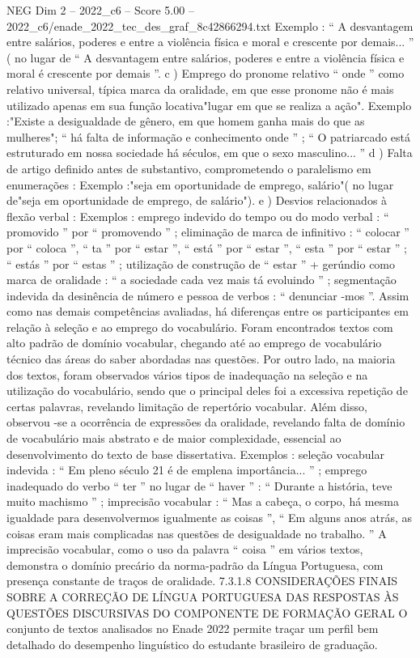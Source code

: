 \begin{textsample}{NEG Dim 2 – 2022\_c6 – Score 5.00 – 2022\_c6/enade\_2022\_tec\_des\_graf\_8c42866294.txt}
Exemplo : “ A desvantagem entre salários, poderes e entre a violência física e moral e crescente por demais... ” ( no lugar de “ A desvantagem entre salários, poderes e entre a violência física e moral é crescente por demais ”. c ) Emprego do pronome relativo “ onde ” como relativo universal, típica marca da oralidade, em que esse pronome não é mais utilizado apenas em sua função locativa"lugar em que se realiza a ação".
Exemplo :"Existe a desigualdade de gênero, em que homem ganha mais do que as mulheres"; “ há falta de informação e conhecimento onde ” ; “ O patriarcado está estruturado em nossa sociedade há séculos, em que o sexo masculino... ” d ) Falta de artigo definido antes de substantivo, comprometendo o paralelismo em enumerações : Exemplo :"seja em oportunidade de emprego, salário"( no lugar de"seja em oportunidade de emprego, de salário"). e ) Desvios relacionados à flexão verbal : Exemplos : emprego indevido do tempo ou do modo verbal : “ promovido ” por “ promovendo ” ; eliminação de marca de infinitivo : “ colocar ” por “ coloca ”, “ ta ” por “ estar ”, “ está ” por “ estar ”, “ esta ” por “ estar ” ; “ estás ” por “ estas ” ; utilização de construção de “ estar ” + gerúndio como marca de oralidade : “ a sociedade cada vez mais tá evoluindo ” ; segmentação indevida da desinência de número e pessoa de verbos : “ denunciar -mos ”.
Assim como nas demais competências avaliadas, há diferenças entre os participantes em relação à seleção e ao emprego do vocabulário.
Foram encontrados textos com alto padrão de domínio vocabular, chegando até ao emprego de vocabulário técnico das áreas do saber abordadas nas questões.
Por outro lado, na maioria dos textos, foram observados vários tipos de inadequação na seleção e na utilização do vocabulário, sendo que o principal deles foi a excessiva repetição de certas palavras, revelando limitação de repertório vocabular.
Além disso, observou -se a ocorrência de expressões da oralidade, revelando falta de domínio de vocabulário mais abstrato e de maior complexidade, essencial ao desenvolvimento do texto de base dissertativa.
Exemplos : seleção vocabular indevida : “ Em pleno século 21 é de emplena importância... ” ; emprego inadequado do verbo “ ter ” no lugar de “ haver ” : “ Durante a história, teve muito machismo ” ; imprecisão vocabular : “ Mas a cabeça, o corpo, há mesma igualdade para desenvolvermos igualmente as coisas ”, “ Em alguns anos atrás, as coisas eram mais complicadas nas questões de desigualdade no trabalho. ” A imprecisão vocabular, como o uso da palavra “ coisa ” em vários textos, demonstra o domínio precário da norma-padrão da Língua Portuguesa, com presença constante de traços de oralidade. 7.3.1.8 CONSIDERAÇÕES FINAIS SOBRE A CORREÇÃO DE LÍNGUA PORTUGUESA DAS RESPOSTAS ÀS QUESTÕES DISCURSIVAS DO COMPONENTE DE FORMAÇÃO GERAL O conjunto de textos analisados no Enade 2022 permite traçar um perfil bem detalhado do desempenho linguístico do estudante brasileiro de graduação.

\end{textsample}
